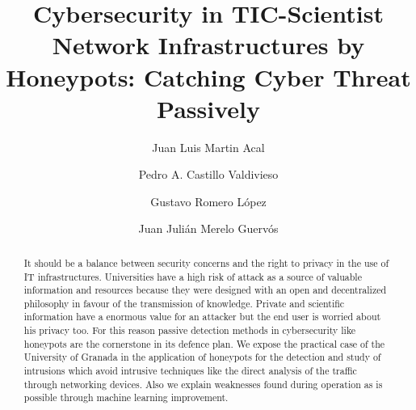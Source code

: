 \documentclass[a4paper]{llncs}
\begin{document}
\pagestyle{empty}

\mainmatter

\title{Cybersecurity in TIC-Scientist Network Infrastructures by
  Honeypots: Catching Cyber Threat Passively}
\author{Juan Luis Martin Acal \and Pedro A. Castillo Valdivieso
\and Gustavo Romero López \and Juan Julián Merelo Guervós}



\maketitle

\begin{abstract}
It should be a balance between security concerns and the right to
privacy in the use of IT infrastructures. Universities have a high risk of attack as a source of valuable information and resources because they were designed with an open and decentralized philosophy in favour of the transmission of knowledge.
Private and scientific information have a enormous value for an attacker but the end user is worried about his privacy too. %
 For this reason passive detection methods in cybersecurity like
 honeypots are the cornerstone in its defence plan. We expose the
 practical case of the University of Granada in the application of
 honeypots for the detection and study of intrusions which avoid intrusive techniques like the direct analysis of the traffic through networking devices. Also we explain weaknesses found during operation as is possible through machine learning improvement. 
 
\end{abstract}
\end{document}
